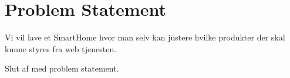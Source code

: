 \section{Problem Statement} \label{sec:problem-statement}

Vi vil lave et SmartHome hvor man selv kan justere hvilke produkter der skal kunne styres fra web tjenesten.

Slut af med problem statement.